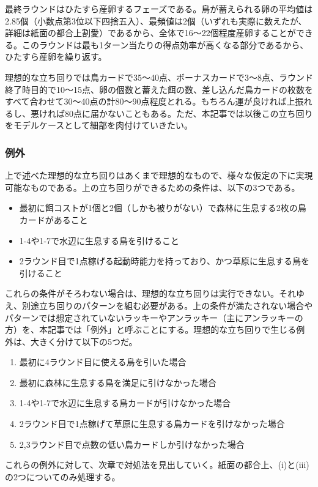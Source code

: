 \begin{multicols}{2}
\par
最終ラウンドはひたすら産卵するフェーズである。鳥が蓄えられる卵の平均値は2.85個（小数点第3位以下四捨五入）、最頻値は2個（いずれも実際に数えたが、詳細は紙面の都合上割愛）であるから、全体で16～22個程度産卵することができる。このラウンドは最も1ターン当たりの得点効率が高くなる部分であるから、ひたすら産卵を繰り返す。
\par
理想的な立ち回りでは鳥カードで35～40点、ボーナスカードで3～8点、ラウンド終了時目的で10～15点、卵の個数と蓄えた餌の数、差し込んだ鳥カードの枚数をすべて合わせて30～40点の計80～90点程度とれる。もちろん運が良ければ上振れるし、悪ければ80点に届かないこともある。ただ、本記事では以後この立ち回りをモデルケースとして細部を肉付けていきたい。
\subsubsection{例外}
上で述べた理想的な立ち回りはあくまで理想的なもので、様々な仮定の下に実現可能なものである。上の立ち回りができるための条件は、以下の3つである。
\begin{itemize}
  \item 最初に餌コストが1個と2個（しかも被りがない）で森林に生息する2枚の鳥カードがあること
  \item 1-4や1-7で水辺に生息する鳥を引けること
  \item 2ラウンド目で1点稼げる起動時能力を持っており、かつ草原に生息する鳥を引けること
\end{itemize}
これらの条件がそろわない場合は、理想的な立ち回りは実行できない。それゆえ、別途立ち回りのパターンを組む必要がある。上の条件が満たされない場合やパターンでは想定されていないラッキーやアンラッキー（主にアンラッキーの方）を、本記事では「例外」と呼ぶことにする。理想的な立ち回りで生じる例外は、大きく分けて以下の5つだ。
\begin{enumerate}
  \item 最初に4ラウンド目に使える鳥を引いた場合
  \item 最初に森林に生息する鳥を満足に引けなかった場合
  \item 1-4や1-7で水辺に生息する鳥カードが引けなかった場合
  \item 2ラウンド目で1点稼げて草原に生息する鳥カードを引けなかった場合
  \item 2,3ラウンド目で点数の低い鳥カードしか引けなかった場合
\end{enumerate}
これらの例外に対して、次章で対処法を見出していく。紙面の都合上、(i)と(i\hspace{-1.2pt}i\hspace{-1.2pt}i)の2つについてのみ処理する。
\end{multicols}
